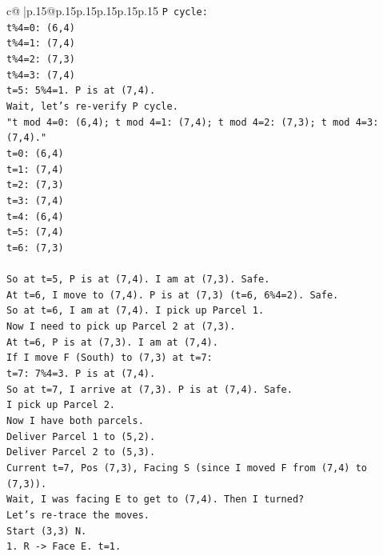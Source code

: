 \documentclass{article}
\begin{document}
{\begin{supertabular}{c@{$\;$}|p{.15\linewidth}@{}p{.15\linewidth}p{.15\linewidth}p{.15\linewidth}p{.15\linewidth}p{.15\linewidth}}
{{{\texttt{P cycle:} \\
\texttt{t\%4=0: (6,4)} \\
\texttt{t\%4=1: (7,4)} \\
\texttt{t\%4=2: (7,3)} \\
\texttt{t\%4=3: (7,4)} \\
\texttt{t=5: 5\%4=1. P is at (7,4).} \\
\texttt{Wait, let's re{-}verify P cycle.} \\
\texttt{"t mod 4=0: (6,4); t mod 4=1: (7,4); t mod 4=2: (7,3); t mod 4=3: (7,4)."} \\
\texttt{t=0: (6,4)} \\
\texttt{t=1: (7,4)} \\
\texttt{t=2: (7,3)} \\
\texttt{t=3: (7,4)} \\
\texttt{t=4: (6,4)} \\
\texttt{t=5: (7,4)} \\
\texttt{t=6: (7,3)} \\
\\ 
\texttt{So at t=5, P is at (7,4). I am at (7,3). Safe.} \\
\texttt{At t=6, I move to (7,4). P is at (7,3) (t=6, 6\%4=2). Safe.} \\
\texttt{So at t=6, I am at (7,4). I pick up Parcel 1.} \\
\texttt{Now I need to pick up Parcel 2 at (7,3).} \\
\texttt{At t=6, P is at (7,3). I am at (7,4).} \\
\texttt{If I move F (South) to (7,3) at t=7:} \\
\texttt{t=7: 7\%4=3. P is at (7,4).} \\
\texttt{So at t=7, I arrive at (7,3). P is at (7,4). Safe.} \\
\texttt{I pick up Parcel 2.} \\
\texttt{Now I have both parcels.} \\
\texttt{Deliver Parcel 1 to (5,2).} \\
\texttt{Deliver Parcel 2 to (5,3).} \\
\texttt{Current t=7, Pos (7,3), Facing S (since I moved F from (7,4) to (7,3)).} \\
\texttt{Wait, I was facing E to get to (7,4). Then I turned?} \\
\texttt{Let's re{-}trace the moves.} \\
\texttt{Start (3,3) N.} \\
\texttt{1. R {-}> Face E. t=1.} \\
}}}
\end{supertabular}}
\end{document}

